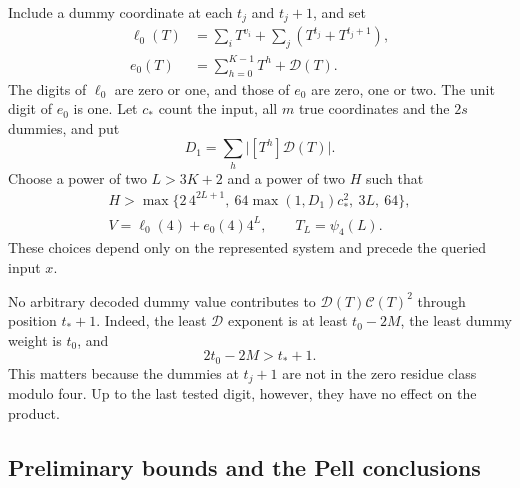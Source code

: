 Include a dummy coordinate at each $t_j$ and $t_j+1$, and set
\begin{equation}\label{eq:linear-radix-codes}
 \begin{aligned}
 \ell_0(T)&=\sum_iT^{v_i}+\sum_j(T^{t_j}+T^{t_j+1}),\\
 e_0(T)&=\sum_{h=0}^{K-1}T^h+\mathcal D(T).
 \end{aligned}
\end{equation}
The digits of $\ell_0$ are zero or one, and those of $e_0$ are
zero, one or two. The unit digit of $e_0$ is one. Let $c_*$ count
the input, all $m$ true coordinates and the $2s$ dummies, and put
\[
 D_1=\sum_h\bigl|[T^h]\mathcal D(T)\bigr|.
\]
Choose a power of two $L>3K+2$ and a power of two $H$ such that
\begin{equation}\label{eq:linear-radix-index}
 \begin{gathered}
 H>\max\{2\,4^{2L+1},\ 64\max(1,D_1)c_*^2,\ 3L,\ 64\},\\
 V=\ell_0(4)+e_0(4)4^L,\qquad T_L=\psi_4(L).
 \end{gathered}
\end{equation}
These choices depend only on the represented system and precede
the queried input $x$.

No arbitrary decoded dummy value contributes to
$\mathcal D(T)\mathcal C(T)^2$ through position $t_*+1$.
Indeed, the least $\mathcal D$ exponent is at least $t_0-2M$,
the least dummy weight is $t_0$, and
\begin{equation}\label{eq:linear-radix-dummies}
 2t_0-2M>t_*+1.
\end{equation}
This matters because the dummies at $t_j+1$ are not in the zero
residue class modulo four. Up to the last tested digit, however,
they have no effect on the product.

\subsection{Preliminary bounds and the Pell conclusions}

